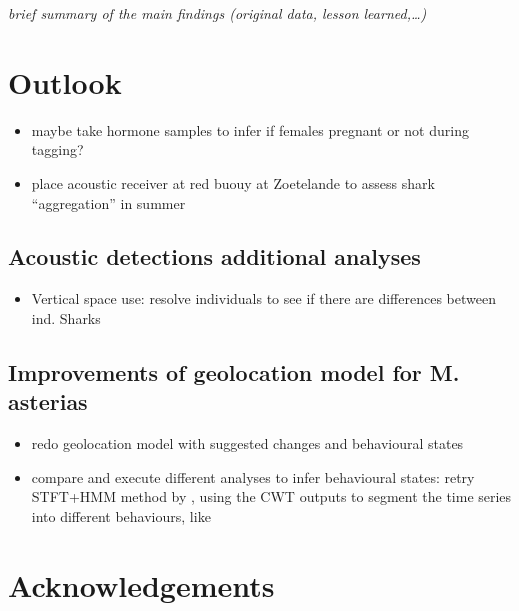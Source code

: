 \documentclass[
  authoryear,
  review,
  3p]{elsarticle}
\providecommand{\tightlist}{%
  \setlength{\itemsep}{0pt}\setlength{\parskip}{0pt}}\usepackage{longtable,booktabs,array}
\begin{document}
\emph{brief summary of the main findings (original data, lesson
learned,\ldots)}

\hypertarget{outlook}{%
\section{Outlook}\label{outlook}}

\begin{itemize}
\tightlist
\item
  maybe take hormone samples to infer if females pregnant or not during
  tagging?
\item
  place acoustic receiver at red buouy at Zoetelande to assess shark
  ``aggregation'' in summer
\end{itemize}

\hypertarget{acoustic-detections-additional-analyses}{%
\subsection{Acoustic detections additional
analyses}\label{acoustic-detections-additional-analyses}}

\begin{itemize}
\tightlist
\item
  Vertical space use: resolve individuals to see if there are
  differences between ind. Sharks
\end{itemize}

\hypertarget{improvements-of-geolocation-model-for-m.-asterias}{%
\subsection{Improvements of geolocation model for M.
asterias}\label{improvements-of-geolocation-model-for-m.-asterias}}

\begin{itemize}
\item
  redo geolocation model with suggested changes and behavioural states
\item
  compare and execute different analyses to infer behavioural states:
  retry STFT+HMM method by \citet{heerah_2017}, using the CWT outputs to
  segment the time series into different behaviours, like
  \citet{soleymani_2017}
\end{itemize}

\hypertarget{acknowledgements}{%
\section{Acknowledgements}\label{acknowledgements}}
\end{document}
